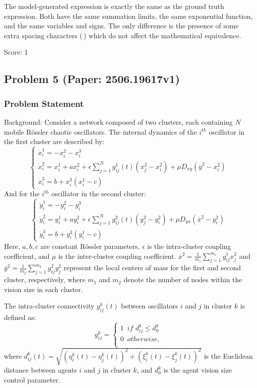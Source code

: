 \documentclass[10pt]{article}
\begin{document}
The model-generated expression is exactly the same as the ground truth expression. Both have the same summation limits, the same exponential function, and the same variables and signs. The only difference is the presence of some extra spacing characters (\,) which do not affect the mathematical equivalence.

Score: 1

\newpage
\subsection*{Problem 5 (Paper: 2506.19617v1)}
\subsubsection*{Problem Statement}
Background:
Consider a network composed of two clusters, each containing $N$ mobile Rössler chaotic oscillators. The internal dynamics of the $i^{th}$ oscillator in the first cluster are described by:
$$
\left\{ \begin{array}{l}
\dot x_i^1 =  - x_i^2 - x_i^3\\
\dot x_i^2 = x_i^1 + ax_i^2 + {\epsilon }\sum\limits_{j = 1}^N {g_{ij}^1(t)\left( {x_j^2 - x_i^2} \right)} + \mu {D_{xy}}\left( {\overline {y}^2   - x_i^2} \right) \\
\dot x_i^3 = b + x_i^3\left( {x_i^1 - c} \right)
\end{array} \right.
$$
And for the $i^{th}$ oscillator in the second cluster:
$$
\left\{ \begin{array}{l}
\dot y_i^1 =  - y_i^2 - y_i^3\\
\dot y_i^2 = y_i^1 + ay_i^2 + {\epsilon }\sum\limits_{j = 1}^N {g_{ij}^2(t)\left( {y_j^2 - y_i^2} \right)} + \mu {D_{yx}}\left( {\overline {x}^2   - y_i^2} \right) \\
\dot y_i^3 = b + y_i^3\left( {y_i^1 - c} \right)
\end{array} \right.
$$
Here, $a, b, c$ are constant Rössler parameters, $\epsilon$ is the intra-cluster coupling coefficient, and $\mu$ is the inter-cluster coupling coefficient. $\overline{x}^2 = \frac{1}{m_1}\sum_{j=1}^{m_1} g_{ij}^1x_j^2$ and $\overline{y}^2 = \frac{1}{m_2}\sum_{j=1}^{m_2} g_{ij}^2y_j^2$ represent the local centers of mass for the first and second cluster, respectively, where $m_1$ and $m_2$ denote the number of nodes within the vision size in each cluster.

The intra-cluster connectivity $g_{ij}^k(t)$ between oscillators $i$ and $j$ in cluster $k$ is defined as:
$$
g_{ij}^k  = \left\{ \begin{array}{l}
 1\,\,\,if\,\,d_{ij}^k  \le d_0^k  \\
 0\,\,\,otherwise, \\
 \end{array} \right.
$$
where $d_{ij}^k(t) = \sqrt {{{\left( {{\eta^k _i}(t) - {\eta^k _j}(t)} \right)}^2} + {{\left( {{\xi^k _i}(t) - {\xi^k _j}(t)} \right)}^2}}$ is the Euclidean distance between agents $i$ and $j$ in cluster $k$, and $d_0^k$ is the agent vision size control parameter.
\end{document}
